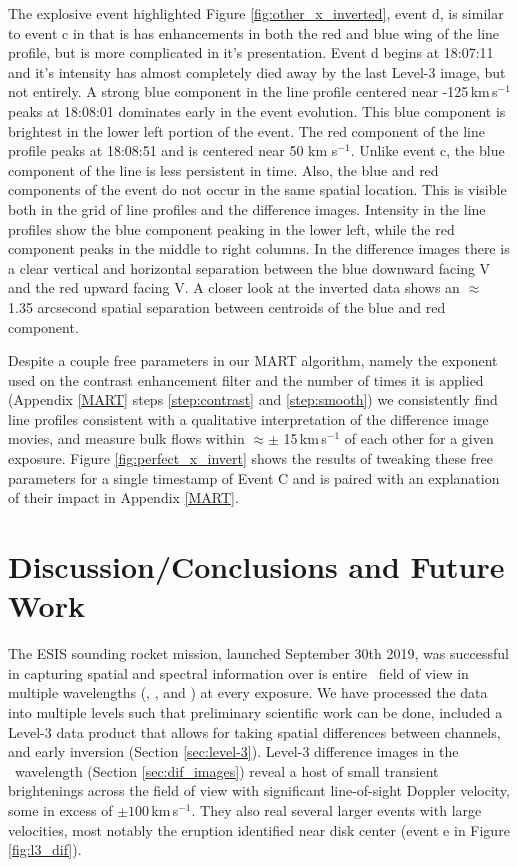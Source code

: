 		The explosive event highlighted Figure \ref{fig:other_x_inverted}, event d, is similar to event c in that is has enhancements in both the red and blue wing of the line profile, but is more complicated in it's presentation.
		Event d  begins at 18:07:11 and it's intensity has almost completely died away by the last Level-3 image, but not entirely. 
		A strong blue component in the line profile centered near -125\,km\,s$^{-1}$  peaks at 18:08:01 dominates early in the event evolution.
		This blue component is brightest in the lower left portion of the event.
		The red component of the line profile peaks at 18:08:51 and is centered near 50 km s$^{-1}$.
		Unlike event c, the blue component of the line is less persistent in time.
		Also, the blue and red components of the event do not occur in the same spatial location.
		This is visible both in the grid of line profiles and the difference images.
		Intensity in the line profiles show the blue component peaking in the lower left, while the red component peaks in the middle to right columns.
		In the difference images there is a clear vertical and horizontal separation between the blue downward facing V and the red upward facing V. 
		A closer look at the inverted data shows an $\approx$ 1.35 arcsecond spatial separation between centroids of the blue and red component.

		Despite a couple free parameters in our MART algorithm, namely the exponent used on the contrast enhancement filter and the number of times it is applied (Appendix \ref{MART} steps \ref{step:contrast} and \ref{step:smooth}) we consistently find line profiles consistent with a qualitative interpretation of the difference image movies, and measure bulk flows within $\approx\pm$ 15\,km\,s$^{-1}$ of each other for a given exposure.
		Figure \ref{fig:perfect_x_invert} shows the results of tweaking these free parameters for a single timestamp of Event C and is paired with an explanation of their impact in Appendix \ref{MART}.
	    		   	
    	
\section{Discussion/Conclusions and Future Work}
	The ESIS sounding rocket mission, launched September 30th 2019, was successful in capturing spatial and spectral information over is entire \esisfov \ field of view in multiple wavelengths (\hei, \mgxbright, and \ov) at every exposure.
	We have processed the data into multiple levels such that preliminary scientific work can be done, included a Level-3 data product that allows for taking spatial differences between channels, and early inversion (Section \ref{sec:level-3}).
	Level-3 difference images in the \ov \ wavelength (Section \ref{sec:dif_images}) reveal a host of small transient brightenings across the field of view with significant line-of-sight Doppler velocity, some in excess of $\pm 100\,$km\,s$^{-1}$.
	They also real several larger events with large velocities, most notably the eruption identified near disk center (event e in Figure \ref{fig:l3_dif}).
	
